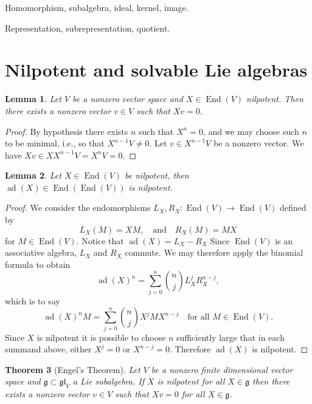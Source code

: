 \documentclass[12pt]{article}
\theoremstyle{plain}
\newtheorem{thm}{Theorem}[section]
\newtheorem{lemma}[thm]{Lemma}
\theoremstyle{definition}
\numberwithin{equation}{section}
\DeclareMathOperator{\ad}{ad}
\DeclareMathOperator{\en}{End}
\newcommand{\g}{\mathfrak{g}}
\newcommand{\gll}{\mathfrak{gl}}
\begin{document}
Homomorphism, subalgebra, ideal, kernel, image.

Representation, subrepresentation, quotient.


\section{Nilpotent and solvable Lie algebras}



\begin{lemma}\label{lem:nilp.has.eigenvector}
Let $V$ be a nonzero vector space and $X \in \en(V)$ nilpotent. Then there exists a nonzero vector $v \in V$ such that $Xv = 0$.
\end{lemma}

\begin{proof}
By hypothesis there exists $n$ such that $X^n = 0$, and we may choose such $n$ to be minimal, i.e., so that $X^{n-1}V \neq 0$. Let $v \in X^{n-1}V$ be a nonzero vector. We have $Xv \in XX^{n-1}V = X^nV = 0$.
\end{proof}


\begin{lemma}
Let $X \in \en(V)$ be nilpotent, then $\ad(X) \in \en(\en(V))$ is nilpotent.
\end{lemma}

\begin{proof}
We consider the endomorphisms $L_X, R_X : \en(V) \rightarrow \en(V)$ defined by
\[
L_X(M) = XM, \quad \text{and} \quad R_X(M) = MX
\]
for $M \in \en(V)$. Notice that $\ad(X) = L_X - R_X$ Since $\en(V)$ is an associative algebra, $L_X$ and $R_X$ commute. We may therefore apply the binomial formula to obtain
\[
\ad(X)^n = \sum_{j=0}^n \binom{n}{j} L_X^j R_X^{n-j},
\]
which is to say
\[
\ad(X)^n M = \sum_{j=0}^n \binom{n}{j} X^j M X^{n-j} \quad \text{for all $M \in \en(V)$}.
\]
Since $X$ is nilpotent it is possible to choose $n$ sufficiently large that in each summand above, either $X^j = 0$ or $X^{n-j} = 0$. Therefore $\ad(X)$ is nilpotent.
\end{proof}






\begin{thm}[Engel's Theorem]
Let $V$ be a nonzero finite dimensional vector space and $\g \subset \gll_V$ a Lie subalgebra. If $X$ is nilpotent for all $X \in \g$ then there exists a nonzero vector $v \in V$ such that $X v = 0$ for all $X \in \g$.
\end{thm}
\end{document}
